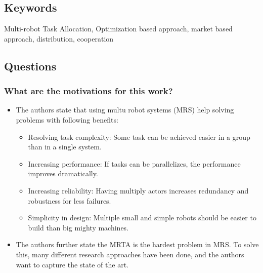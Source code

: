 \documentclass{article}
\begin{document}
\subsection*{Keywords}
Multi-robot Task Allocation, Optimization based approach, market based approach, distribution, cooperation

\subsection*{Questions}
\subsubsection*{What are the motivations for this work?}
\begin{itemize}
    \item The authors state that using multu robot systems (MRS) help solving problems with following benefits: \ \begin{itemize}
        \item Resolving task complexity: Some task can be achieved easier in a group than in a single system.
        \item Increasing performance: If tasks can be parallelizes, the performance improves dramatically.
        \item Increasing reliability: Having multiply actors increases redundancy and robustness for less failures.
        \item Simplicity in design: Multiple small and simple robots should be easier to build than big mighty machines.
    \end{itemize}
    \item The authors further state the MRTA is the hardest problem in MRS. To solve this, many different research approaches have been done, and the authors want to capture the state of the art.
\end{itemize}
\end{document}
